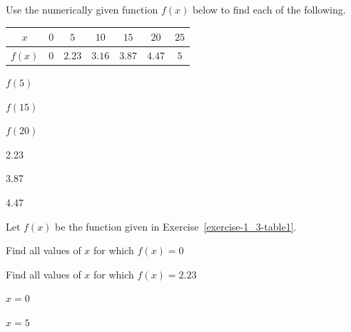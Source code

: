
\begin{exercise}\label{exercise-1_3-table1}
Use the numerically given function $f(x)$ below to find each of the following.

\begin{center}
\begin{tabular}{|c|c|c|c|c|c|c|} \hline
$x$ & $0$ & $5$ & $10$ & $15$ & $20$ & $25$  \\ \hline
$f(x)$ & $0$  & $2.23$  & $3.16$ &  $3.87$ &  $4.47$ &  $5$ \\ \hline
\end{tabular}
\end{center}

\begin{parts}
\item $f(5)$
\item $f(15)$
\item $f(20)$
\end{parts}
\end{exercise}


\begin{solution}
    \begin{parts}
    \item 2.23
    \item 3.87
    \item 4.47
    \end{parts}
\end{solution}








\begin{exercise}
Let $f(x)$ be the function given in Exercise~\ref{exercise-1_3-table1}.
\begin{parts}
\item Find all values of $x$ for which $f(x) = 0$
\item Find all values of $x$ for which $f(x) = 2.23$
\end{parts}
\end{exercise}


\begin{solution}
\begin{parts}
    \item $x=0$
    \item $x=5$
\end{parts}
\end{solution}



